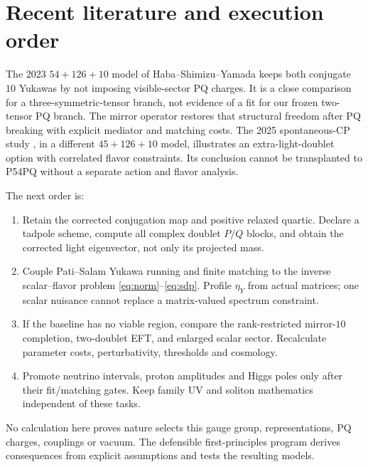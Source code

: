 \documentclass[11pt]{article}
\begin{document}
\section{Recent literature and execution order}
The 2023 $54+126+10$ model of Haba--Shimizu--Yamada \cite{hsy} keeps
both conjugate $10$ Yukawas by not imposing visible-sector PQ charges.
It is a close comparison for a three-symmetric-tensor branch, not
evidence of a fit for our frozen two-tensor PQ branch.
The mirror operator restores that structural freedom after PQ breaking
with explicit mediator and matching costs.
The 2025 spontaneous-CP study \cite{gao}, in a different
$45+126+10$ model, illustrates an extra-light-doublet option with
correlated flavor constraints. Its conclusion cannot be transplanted
to P54PQ without a separate action and flavor analysis.

The next order is:
\begin{enumerate}
\item Retain the corrected conjugation map and positive relaxed quartic.
Declare a tadpole scheme, compute all complex doublet $P/Q$ blocks,
and obtain the corrected light eigenvector, not only its projected mass.
\item Couple Pati--Salam Yukawa running and finite matching to the inverse
scalar--flavor problem \eqref{eq:norm}--\eqref{eq:sdp}.
Profile $\eta_Y$ from actual matrices; one scalar nuisance cannot
replace a matrix-valued spectrum constraint.
\item If the baseline has no viable region, compare the rank-restricted
mirror-$10$ completion, two-doublet EFT, and enlarged scalar sector.
Recalculate parameter costs, perturbativity, thresholds and cosmology.
\item Promote neutrino intervals, proton amplitudes and Higgs poles only
after their fit/matching gates. Keep family UV and soliton mathematics
independent of these tasks.
\end{enumerate}
No calculation here proves nature selects this gauge group,
representations, PQ charges, couplings or vacuum.
The defensible first-principles program derives consequences from
explicit assumptions and tests the resulting models.

\appendix
\end{document}
